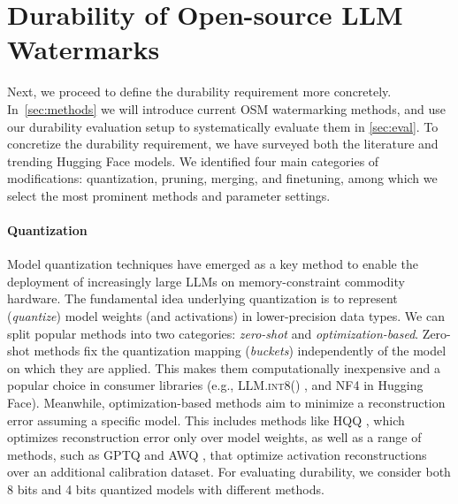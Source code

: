 \section{Durability of Open-source LLM Watermarks}
\label{sec:durability}

Next, we proceed to define the durability requirement more concretely. In~\cref{sec:methods} we will introduce current OSM watermarking methods, and use our durability evaluation setup to systematically evaluate them in \cref{sec:eval}.
To concretize the durability requirement, we have surveyed both the literature and trending Hugging Face models.  
We identified four main categories of modifications: quantization, pruning, merging, and finetuning, among which we select the most prominent methods and parameter settings.


\paragraph{Quantization} 
Model quantization techniques have emerged as a key method to enable the deployment of increasingly large LLMs on memory-constraint commodity hardware. The fundamental idea underlying quantization is to represent (\textit{quantize}) model weights (and activations) in lower-precision data types. We can split popular methods into two categories: \emph{zero-shot} and \emph{optimization-based}.
Zero-shot methods fix the quantization mapping (\textit{buckets}) independently of the model on which they are applied. This makes them computationally inexpensive and a popular choice in consumer libraries (e.g., \textsc{LLM.int8()} \citep{llmint8}, and \textsc{NF4} \citep{qlora} in Hugging Face). Meanwhile, optimization-based methods aim to minimize a reconstruction error assuming a specific model. This includes methods like \textsc{HQQ} \citep{hqq}, which optimizes reconstruction error only over model weights, as well as a range of methods, such as \textsc{GPTQ} \citep{gptq} and \textsc{AWQ} \citep{awq}, that optimize activation reconstructions over an additional calibration dataset.
For evaluating durability, we consider both 8 bits and 4 bits quantized models with different methods.

